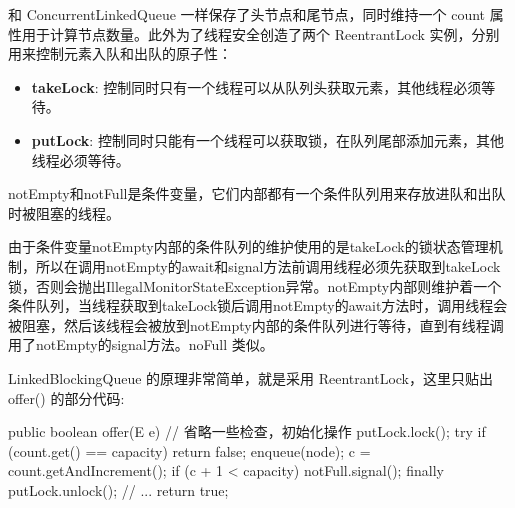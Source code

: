 和 ConcurrentLinkedQueue 一样保存了头节点和尾节点，同时维持一个 count 属性用于计算节点数量。此外为了线程安全创造了两个 ReentrantLock 实例，分别用来控制元素入队和出队的原子性：
\begin{itemize}
    \item \textbf{takeLock}: 控制同时只有一个线程可以从队列头获取元素，其他线程必须等待。
    \item \textbf{putLock}: 控制同时只能有一个线程可以获取锁，在队列尾部添加元素，其他线程必须等待。
\end{itemize}

notEmpty和notFull是条件变量，它们内部都有一个条件队列用来存放进队和出队时被阻塞的线程。

由于条件变量notEmpty内部的条件队列的维护使用的是takeLock的锁状态管理机制，所以在调用notEmpty的await和signal方法前调用线程必须先获取到takeLock锁，否则会抛出IllegalMonitorStateException异常。notEmpty内部则维护着一个条件队列，当线程获取到takeLock锁后调用notEmpty的await方法时，调用线程会被阻塞，然后该线程会被放到notEmpty内部的条件队列进行等待，直到有线程调用了notEmpty的signal方法。noFull 类似。

LinkedBlockingQueue 的原理非常简单，就是采用 ReentrantLock，这里只贴出 offer() 的部分代码:

\begin{Java}
public boolean offer(E e) {
    // 省略一些检查，初始化操作
    putLock.lock();
    try {
        if (count.get() == capacity)
            return false;
        enqueue(node);
        c = count.getAndIncrement();
        if (c + 1 < capacity)
            notFull.signal();
    } finally {
        putLock.unlock();
    }
    // ...
    return true;
}
\end{Java}

